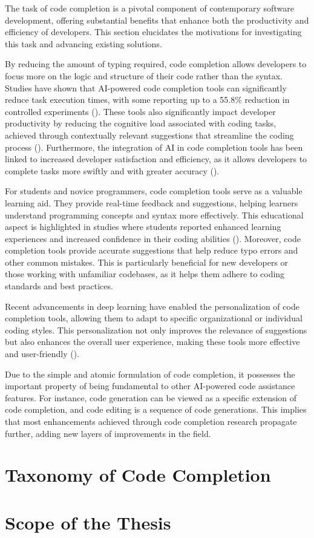 The task of code completion is a pivotal component of contemporary software development, offering substantial benefits that enhance both the productivity and efficiency of developers. This section elucidates the motivations for investigating this task and advancing existing solutions.

By reducing the amount of typing required, code completion allows developers to focus more on the logic and structure of their code rather than the syntax. Studies have shown that AI-powered code completion tools can significantly reduce task execution times, with some reporting up to a 55.8\% reduction in controlled experiments (\cite{peng2023}). These tools also significantly impact developer productivity by reducing the cognitive load associated with coding tasks, achieved through contextually relevant suggestions that streamline the coding process (\cite{weber2024}). Furthermore, the integration of AI in code completion tools has been linked to increased developer satisfaction and efficiency, as it allows developers to complete tasks more swiftly and with greater accuracy (\cite{bakal2025}).

For students and novice programmers, code completion tools serve as a valuable learning aid. They provide real-time feedback and suggestions, helping learners understand programming concepts and syntax more effectively. This educational aspect is highlighted in studies where students reported enhanced learning experiences and increased confidence in their coding abilities (\cite{takerngsaksiri2024}). Moreover, code completion tools provide accurate suggestions that help reduce typo errors and other common mistakes. This is particularly beneficial for new developers or those working with unfamiliar codebases, as it helps them adhere to coding standards and best practices.

Recent advancements in deep learning have enabled the personalization of code completion tools, allowing them to adapt to specific organizational or individual coding styles. This personalization not only improves the relevance of suggestions but also enhances the overall user experience, making these tools more effective and user-friendly (\cite{giagnorio2025}).

Due to the simple and atomic formulation of code completion, it possesses the important property of being fundamental to other AI-powered code assistance features. For instance, code generation can be viewed as a specific extension of code completion, and code editing is a sequence of code generations. This implies that most enhancements achieved through code completion research propagate further, adding new layers of improvements in the field. 

\section{Taxonomy of Code Completion}

\section{Scope of the Thesis}
